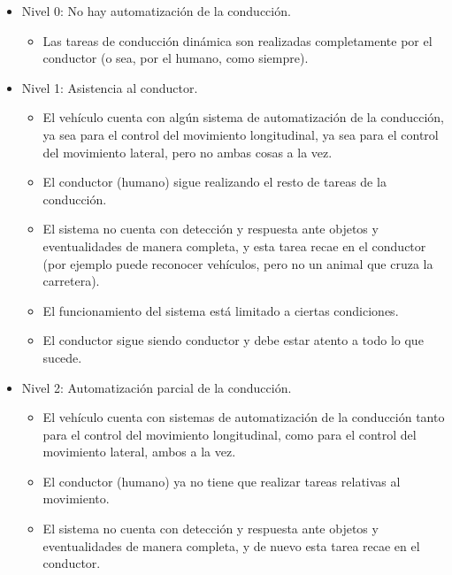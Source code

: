 \documentclass{pclass}
\begin{document}
\begin{itemize}
	
	\item Nivel 0: No hay automatización de la conducción.
	
	\begin{itemize}
		\item Las tareas de conducción dinámica son realizadas completamente por el conductor (o sea, por el humano, como siempre).
	\end{itemize}

	\item Nivel 1: Asistencia al conductor.
	\begin{itemize}
		\item El vehículo cuenta con algún sistema de automatización de la conducción, ya sea para el control del movimiento longitudinal, ya sea para el control del movimiento lateral, pero no ambas cosas a la vez.
		
		\item El conductor (humano) sigue realizando el resto de tareas de la conducción.
		
		\item El sistema no cuenta con detección y respuesta ante objetos y eventualidades de manera completa, y esta tarea recae en el conductor (por ejemplo puede reconocer vehículos, pero no un animal que cruza la carretera).
		
		\item El funcionamiento del sistema está limitado a ciertas condiciones.
		
		\item El conductor sigue siendo conductor y debe estar atento a todo lo que sucede.
	\end{itemize}
	
	\item Nivel 2: Automatización parcial de la conducción.
	
	\begin{itemize}
		\item El vehículo cuenta con sistemas de automatización de la conducción tanto para el control del movimiento longitudinal, como para el control del movimiento lateral, ambos a la vez.
		
		\item El conductor (humano) ya no tiene que realizar tareas relativas al movimiento.
		
		\item El sistema no cuenta con detección y respuesta ante objetos y eventualidades de manera completa, y de nuevo esta tarea recae en el conductor.
		

\end{itemize}
\end{itemize}
\end{document}
